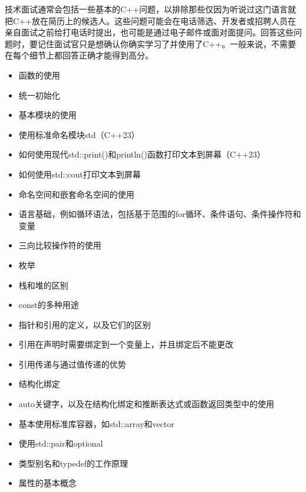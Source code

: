 
技术面试通常会包括一些基本的C++问题，以排除那些仅因为听说过这门语言就把C++放在简历上的候选人。这些问题可能会在电话筛选、开发者或招聘人员在亲自面试之前给打电话时提出，也可能是通过电子邮件或面对面提问。回答这些问题时，要记住面试官只是想确认你确实学习了并使用了C++。一般来说，不需要在每个细节上都回答正确才能得到高分。


\begin{itemize}
\item
函数的使用

\item
统一初始化

\item
基本模块的使用

\item
使用标准命名模块std（C++23）

\item
如何使用现代std::print()和println()函数打印文本到屏幕（C++23）

\item
如何使用std::cout打印文本到屏幕

\item
命名空间和嵌套命名空间的使用

\item
语言基础，例如循环语法，包括基于范围的for循环、条件语句、条件操作符和变量

\item
三向比较操作符的使用

\item
枚举

\item
栈和堆的区别

\item
const的多种用途

\item
指针和引用的定义，以及它们的区别

\item
引用在声明时需要绑定到一个变量上，并且绑定后不能更改

\item
引用传递与通过值传递的优势

\item
结构化绑定

\item
auto关键字，以及在结构化绑定和推断表达式或函数返回类型中的使用

\item
基本使用标准库容器，如std::array和vector

\item
使用std::pair和optional

\item
类型别名和typedef的工作原理

\item
属性的基本概念
\end{itemize}

